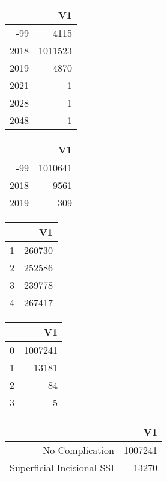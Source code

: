 \bigskip\bigskip
\centering
\begin{tabular}{rr}
  \hline
 & V1 \\ 
  \hline
-99 & 4115 \\ 
  2018 & 1011523 \\ 
  2019 & 4870 \\ 
  2021 &   1 \\ 
  2028 &   1 \\ 
  2048 &   1 \\ 
   \hline
\end{tabular}

\bigskip\bigskip
\centering
\begin{tabular}{rr}
  \hline
 & V1 \\ 
  \hline
-99 & 1010641 \\ 
  2018 & 9561 \\ 
  2019 & 309 \\ 
   \hline
\end{tabular}

\bigskip\bigskip
\centering
\begin{tabular}{rr}
  \hline
 & V1 \\ 
  \hline
1 & 260730 \\ 
  2 & 252586 \\ 
  3 & 239778 \\ 
  4 & 267417 \\ 
   \hline
\end{tabular}

\bigskip\bigskip
\centering
\begin{tabular}{rr}
  \hline
 & V1 \\ 
  \hline
0 & 1007241 \\ 
  1 & 13181 \\ 
  2 &  84 \\ 
  3 &   5 \\ 
   \hline
\end{tabular}

\bigskip\bigskip
\centering
\begin{tabular}{rr}
  \hline
 & V1 \\ 
  \hline
No Complication & 1007241 \\ 
  Superficial Incisional SSI & 13270 \\ 
   \hline
\end{tabular}

